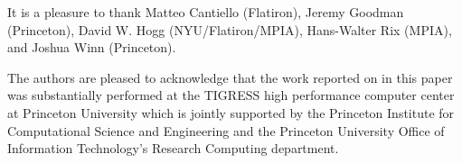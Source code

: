\documentclass[modern, letterpaper]{aastex62}
\newcommand{\apogee}{\project{\acronym{APOGEE}}}
\newcommand{\sdssiv}{\project{\acronym{SDSS-IV}}}
\begin{document}
\acknowledgements

It is a pleasure to thank
Matteo Cantiello (Flatiron),
Jeremy Goodman (Princeton),
David W. Hogg (NYU/Flatiron/MPIA),
Hans-Walter Rix (MPIA),
and Joshua Winn (Princeton).

The authors are pleased to acknowledge that the work reported on in this
paper was substantially performed at the TIGRESS high performance computer
center at Princeton University which is jointly supported by the Princeton
Institute for Computational Science and Engineering and the Princeton
University Office of Information Technology's Research Computing department.


\facility{\sdssiv, \apogee}

\clearpage



\end{document}
